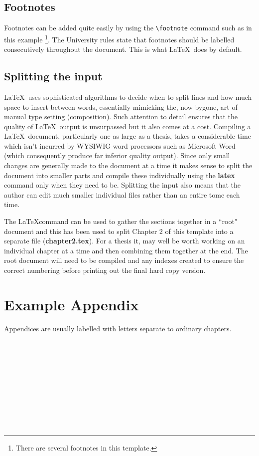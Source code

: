 \documentclass[11pt,oneside]{book}
\begin{document}
\section{Footnotes}
Footnotes can be added quite easily by using the \verb+\footnote+ command
such as in this example \footnote{There are several footnotes in this template.}.
The University rules state that footnotes should be labelled consecutively
throughout the document. This is what \LaTeX \ does by default.

\section{Splitting the input}

\LaTeX \ uses sophisticated algorithms to decide when to split lines
and how much space to insert between words, essentially mimicking the, now 
bygone, art of manual type setting (composition). Such attention
to detail ensures that the quality of \LaTeX \ output is unsurpassed but it
also comes at a cost. Compiling a \LaTeX \ document, particularly one as large
as a thesis, takes a considerable time which isn't incurred by WYSIWIG
word processors such as Microsoft Word (which consequently produce far inferior 
quality output). Since only small changes are generally made to the document
at a time it makes sense to split the document into smaller parts and compile
these individually using the {\bf latex} command only when they need to be. 
Splitting the input also means
that the author can edit much smaller individual files rather than 
an entire tome each time.

The \LaTeX command
\verb++ can be used to gather the sections together in a ``root"
document and this has been used to split Chapter 2 of this template into
a separate file ({\bf chapter2.tex}).  For a thesis it, may
well be worth working on an individual chapter at a time and then combining
them together at the end. The root document will need to be compiled
and any indexes created to ensure the correct numbering before printing
out the final hard copy version. 




\appendix
\chapter{Example Appendix}
Appendices are usually labelled with letters separate to ordinary chapters.





\printindex
{}

\begin{verbatim}










\end{verbatim}
\end{document}
